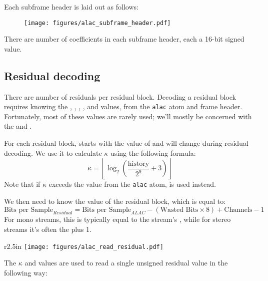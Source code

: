 Each subframe header is laid out as follows:

\begin{figure}[h]
\texttt{[image: figures/alac\_subframe\_header.pdf]}
\end{figure}
\par
\noindent
There are  number of coefficients in each
subframe header, each a 16-bit signed value.

\pagebreak

\subsection{Residual decoding}

There are  number of residuals per residual block.
Decoding a residual block requires knowing the ,
, , ,  and
 values, from the \texttt{alac} atom and frame header.
Fortunately, most of these values are rarely used;
we'll mostly be concerned with the  and .

For each residual block,  starts with the value of
 and will change during residual decoding.
We use it to calculate $\kappa$ using the following formula:
\begin{equation}
\kappa = \left\lfloor\log_2 \left( \frac{\text{history}}{2 ^ 9} + 3 \right) \right\rfloor
\end{equation}
Note that if $\kappa$ exceeds the  value from the
\texttt{alac} atom,  is used instead.

We then need to know the  value of the residual
block, which is equal to:
\begin{equation}
\text{Bits per Sample}_{Residual} = \text{Bits per Sample}_{ALAC} - (\text{Wasted Bits} \times 8) + \text{Channels} - 1
\end{equation}
For mono streams, this is typically equal to the stream's
,
while for stereo streams it's often the  plus 1.

\begin{wrapfigure}[14]{r}{2.5in}
\texttt{[image: figures/alac\_read\_residual.pdf]}
\end{wrapfigure}
The $\kappa$ and  values are used to read a
single unsigned residual value in the following way:

